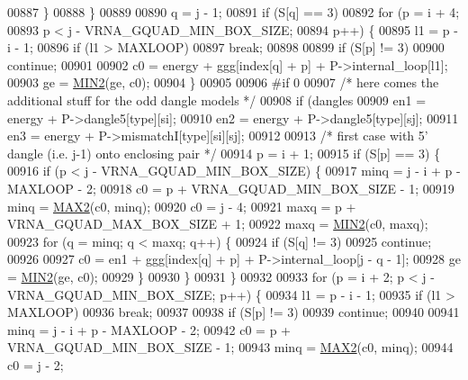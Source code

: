 \begin{DoxyCode}
00887     \}
00888   \}
00889 
00890   q = j - 1;
00891   \textcolor{keywordflow}{if} (S[q] == 3)
00892     \textcolor{keywordflow}{for} (p = i + 4;
00893          p < j - VRNA\_GQUAD\_MIN\_BOX\_SIZE;
00894          p++) \{
00895       l1 = p - i - 1;
00896       \textcolor{keywordflow}{if} (l1 > MAXLOOP)
00897         \textcolor{keywordflow}{break};
00898 
00899       \textcolor{keywordflow}{if} (S[p] != 3)
00900         \textcolor{keywordflow}{continue};
00901 
00902       c0  = energy + ggg[index[q] + p] + P->internal\_loop[l1];
00903       ge  = \hyperlink{group__utils_gae0b9cd0ce090bd69b951aa73e8fa4f7d}{MIN2}(ge, c0);
00904     \}
00905 
00906 \textcolor{preprocessor}{#if 0}
00907   \textcolor{comment}{/* here comes the additional stuff for the odd dangle models */}
00908   \textcolor{keywordflow}{if} (dangles %
00909     en1 = energy + P->dangle5[type][si];
00910     en2 = energy + P->dangle5[type][sj];
00911     en3 = energy + P->mismatchI[type][si][sj];
00912 
00913     \textcolor{comment}{/* first case with 5' dangle (i.e. j-1) onto enclosing pair */}
00914     p = i + 1;
00915     \textcolor{keywordflow}{if} (S[p] == 3) \{
00916       \textcolor{keywordflow}{if} (p < j - VRNA\_GQUAD\_MIN\_BOX\_SIZE) \{
00917         minq  = j - i + p - MAXLOOP - 2;
00918         c0    = p + VRNA\_GQUAD\_MIN\_BOX\_SIZE - 1;
00919         minq  = \hyperlink{group__utils_ga33297b3679c713b0c4d897cd0fe3b122}{MAX2}(c0, minq);
00920         c0    = j - 4;
00921         maxq  = p + VRNA\_GQUAD\_MAX\_BOX\_SIZE + 1;
00922         maxq  = \hyperlink{group__utils_gae0b9cd0ce090bd69b951aa73e8fa4f7d}{MIN2}(c0, maxq);
00923         \textcolor{keywordflow}{for} (q = minq; q < maxq; q++) \{
00924           \textcolor{keywordflow}{if} (S[q] != 3)
00925             \textcolor{keywordflow}{continue};
00926 
00927           c0  = en1 + ggg[index[q] + p] + P->internal\_loop[j - q - 1];
00928           ge  = \hyperlink{group__utils_gae0b9cd0ce090bd69b951aa73e8fa4f7d}{MIN2}(ge, c0);
00929         \}
00930       \}
00931     \}
00932 
00933     \textcolor{keywordflow}{for} (p = i + 2; p < j - VRNA\_GQUAD\_MIN\_BOX\_SIZE; p++) \{
00934       l1 = p - i - 1;
00935       \textcolor{keywordflow}{if} (l1 > MAXLOOP)
00936         \textcolor{keywordflow}{break};
00937 
00938       \textcolor{keywordflow}{if} (S[p] != 3)
00939         \textcolor{keywordflow}{continue};
00940 
00941       minq  = j - i + p - MAXLOOP - 2;
00942       c0    = p + VRNA\_GQUAD\_MIN\_BOX\_SIZE - 1;
00943       minq  = \hyperlink{group__utils_ga33297b3679c713b0c4d897cd0fe3b122}{MAX2}(c0, minq);
00944       c0    = j - 2;

\end{DoxyCode}
